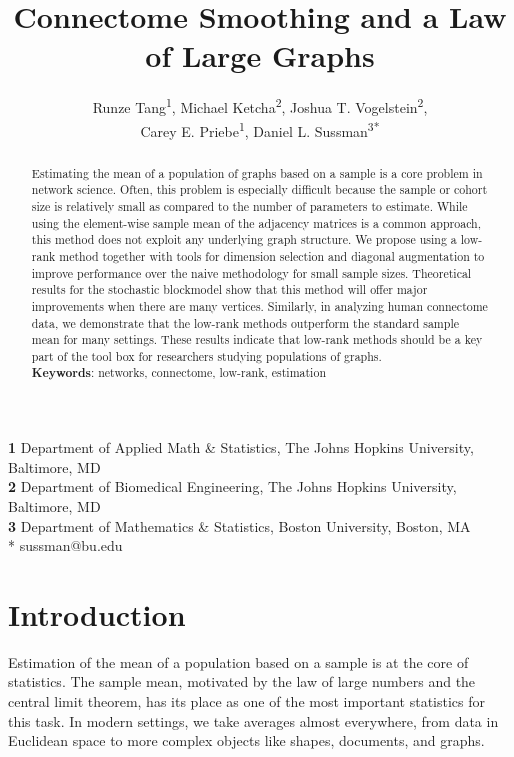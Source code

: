 \documentclass[10pt,letterpaper]{article}
\date{}
\title{Connectome Smoothing and a Law of Large Graphs}
\author{
Runze Tang\textsuperscript{1},
Michael Ketcha\textsuperscript{2},
Joshua T. Vogelstein\textsuperscript{2},\\
Carey E. Priebe\textsuperscript{1},
Daniel L. Sussman\textsuperscript{3*}}
\begin{document}
\maketitle



{\footnotesize
\noindent \textbf{1} Department of Applied Math \& Statistics, The Johns Hopkins University, Baltimore, MD
\\
\textbf{2} Department of Biomedical Engineering,  The Johns Hopkins University, Baltimore, MD
\\
\textbf{3} Department of Mathematics \& Statistics, Boston University, Boston, MA
\\
* sussman@bu.edu
}



\linenumbers
\begin{abstract}
Estimating the mean of a population of graphs based on a sample is a core problem in network science.
Often, this problem is especially difficult because the sample or cohort size is relatively small as compared to the number of parameters to estimate. 
While using the element-wise sample mean of the adjacency matrices is a common approach, this method does not exploit any underlying graph structure.
We propose using a low-rank method together with tools for dimension selection and diagonal augmentation to improve performance over the naive methodology for small sample sizes.
Theoretical results for the stochastic blockmodel show that this method will offer major improvements when there are many vertices.
Similarly, in analyzing human connectome data, we demonstrate that the low-rank methods outperform the standard sample mean for many settings.
These results indicate that low-rank methods should be a key part of the tool box for researchers studying populations of graphs.\\
{\bf Keywords}: networks, connectome, low-rank, estimation
\end{abstract}





\section{Introduction}

Estimation of the mean of a population based on a sample is at the core of statistics.
The sample mean, motivated by the law of large numbers and the central limit theorem, has its place as one of the most important statistics for this task.
In modern settings, we take averages almost everywhere, from data in Euclidean space to more complex objects like shapes, documents, and graphs.
\end{document}
